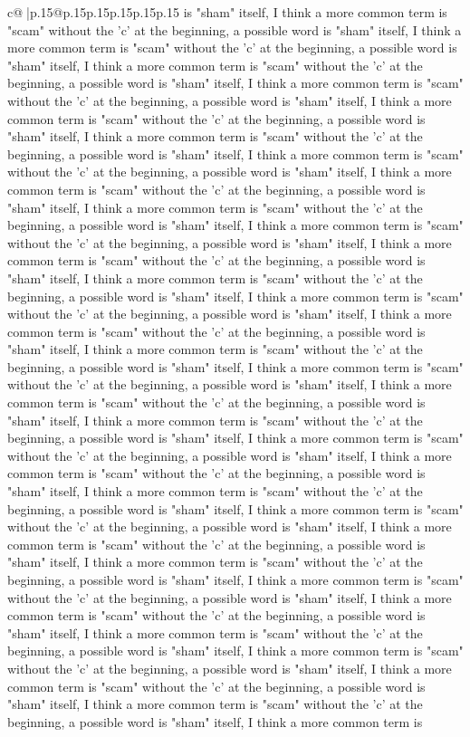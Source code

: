 \documentclass{article}
\begin{document}
{\begin{supertabular}{c@{$\;$}|p{.15\linewidth}@{}p{.15\linewidth}p{.15\linewidth}p{.15\linewidth}p{.15\linewidth}p{.15\linewidth}}
{{{is "sham" itself, I think a more common term is "scam" without the 'c' at the beginning, a possible word is "sham" itself, I think a more common term is "scam" without the 'c' at the beginning, a possible word is "sham" itself, I think a more common term is "scam" without the 'c' at the beginning, a possible word is "sham" itself, I think a more common term is "scam" without the 'c' at the beginning, a possible word is "sham" itself, I think a more common term is "scam" without the 'c' at the beginning, a possible word is "sham" itself, I think a more common term is "scam" without the 'c' at the beginning, a possible word is "sham" itself, I think a more common term is "scam" without the 'c' at the beginning, a possible word is "sham" itself, I think a more common term is "scam" without the 'c' at the beginning, a possible word is "sham" itself, I think a more common term is "scam" without the 'c' at the beginning, a possible word is "sham" itself, I think a more common term is "scam" without the 'c' at the beginning, a possible word is "sham" itself, I think a more common term is "scam" without the 'c' at the beginning, a possible word is "sham" itself, I think a more common term is "scam" without the 'c' at the beginning, a possible word is "sham" itself, I think a more common term is "scam" without the 'c' at the beginning, a possible word is "sham" itself, I think a more common term is "scam" without the 'c' at the beginning, a possible word is "sham" itself, I think a more common term is "scam" without the 'c' at the beginning, a possible word is "sham" itself, I think a more common term is "scam" without the 'c' at the beginning, a possible word is "sham" itself, I think a more common term is "scam" without the 'c' at the beginning, a possible word is "sham" itself, I think a more common term is "scam" without the 'c' at the beginning, a possible word is "sham" itself, I think a more common term is "scam" without the 'c' at the beginning, a possible word is "sham" itself, I think a more common term is "scam" without the 'c' at the beginning, a possible word is "sham" itself, I think a more common term is "scam" without the 'c' at the beginning, a possible word is "sham" itself, I think a more common term is "scam" without the 'c' at the beginning, a possible word is "sham" itself, I think a more common term is "scam" without the 'c' at the beginning, a possible word is "sham" itself, I think a more common term is "scam" without the 'c' at the beginning, a possible word is "sham" itself, I think a more common term is "scam" without the 'c' at the beginning, a possible word is "sham" itself, I think a more common term is "scam" without the 'c' at the beginning, a possible word is "sham" itself, I think a more common term is "scam" without the 'c' at the beginning, a possible word is "sham" itself, I think a more common term is "scam" without the 'c' at the beginning, a possible word is "sham" itself, I think a more common term is "scam" without the 'c' at the beginning, a possible word is "sham" itself, I think a more common term is "scam" without the 'c' at the beginning, a possible word is "sham" itself, I think a more common term is }}}
\end{supertabular}}
\end{document}
